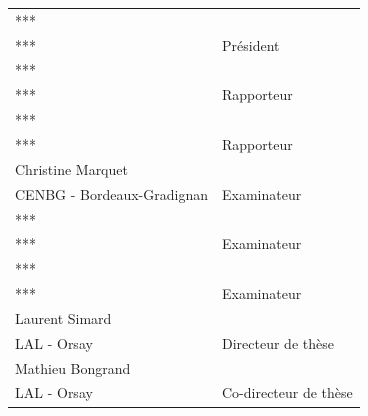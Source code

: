 \documentclass[a4paper]{article}
\newcommand{\jurynameA}{***}
\newcommand{\juryadressA}{***}
\newcommand{\juryroleA}{Président}
\newcommand{\jurynameB}{***}
\newcommand{\juryadressB}{***}
\newcommand{\juryroleB}{Rapporteur}
\newcommand{\jurynameD}{***}
\newcommand{\juryadressD}{***}
\newcommand{\juryroleD}{Rapporteur}
\newcommand{\jurynameE}{Christine Marquet}
\newcommand{\juryadressE}{CENBG - Bordeaux-Gradignan}
\newcommand{\juryroleE}{Examinateur}
\newcommand{\jurynameF}{***}
\newcommand{\juryadressF}{***}
\newcommand{\juryroleF}{Examinateur}
\newcommand{\jurynameG}{***}
\newcommand{\juryadressG}{***}
\newcommand{\juryroleG}{Examinateur}
\newcommand{\jurynameH}{Laurent Simard}
\newcommand{\juryadressH}{LAL - Orsay}
\newcommand{\juryroleH}{Directeur de thèse}
\newcommand{\jurynameI}{Mathieu Bongrand}
\newcommand{\juryadressI}{LAL - Orsay}
\newcommand{\juryroleI}{Co-directeur de thèse}
\begin{document}
\begin{textblock}{9.5}
	\label{jury} 																				%
	\begin{flushleft}
	\begin{tabular}{@{} L{8.5cm} R{2.5cm}}
		\jurynameA  \\ \juryadressA & \juryroleA \\[7pt]
		\jurynameB  \\ \juryadressB & \juryroleB \\[7pt]
		\jurynameD  \\ \juryadressD & \juryroleD \\[7pt]
		\jurynameE  \\ \juryadressE & \juryroleE \\[7pt]
		\jurynameF  \\ \juryadressF & \juryroleF \\[7pt]
		\jurynameG  \\ \juryadressG & \juryroleG \\[7pt]
		\jurynameH  \\ \juryadressH & \juryroleH \\[7pt]
		\jurynameI  \\ \juryadressI & \juryroleI \\[7pt]
	\end{tabular}
	\end{flushleft}
\end{textblock}
\end{document}
